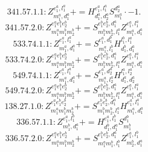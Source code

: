 \documentclass[letterpaper,10pt,fleqn,leqno,onecolumn]{article}
\begin{document}
\begin{equation} \;\;\;\;\;\;  341.57.1.1: Z^{e_{1}^{a},l_{1}^{a}}_{m_{1}^{a},d_{1}^{a}}+=H^{e_{1}^{a},l_{1}^{a}}_{d_{1}^{a},d_{2}^{a}}S^{d_{2}^{a}}_{m_{1}^{a}}\cdot -1. \end{equation}
\begin{equation} \;\;\;\;\;\;  341.57.2.0: Z^{e_{1}^{a}e_{1}^{b}e_{2}^{b}}_{m_{1}^{a}m_{1}^{b}m_{2}^{b}}+=S^{e_{1}^{b}e_{2}^{b},d_{1}^{a}}_{m_{1}^{b}m_{2}^{b},l_{1}^{a}}Z^{e_{1}^{a},l_{1}^{a}}_{m_{1}^{a},d_{1}^{a}} \end{equation}
\begin{equation} \;\;\;\;\;\;  533.74.1.1: Z^{e_{1}^{a},l_{1}^{a}}_{m_{1}^{a},d_{1}^{a}}+=S^{e_{1}^{a},d_{1}^{b}}_{m_{1}^{a},l_{1}^{b}}H^{l_{1}^{b},l_{1}^{a}}_{d_{1}^{b},d_{1}^{a}} \end{equation}
\begin{equation} \;\;\;\;\;\;  533.74.2.0: Z^{e_{1}^{a}e_{1}^{b}e_{2}^{b}}_{m_{1}^{a}m_{1}^{b}m_{2}^{b}}+=S^{e_{1}^{b}e_{2}^{b},d_{1}^{a}}_{m_{1}^{b}m_{2}^{b},l_{1}^{a}}Z^{e_{1}^{a},l_{1}^{a}}_{m_{1}^{a},d_{1}^{a}} \end{equation}
\begin{equation} \;\;\;\;\;\;  549.74.1.1: Z^{e_{1}^{a},l_{1}^{a}}_{m_{1}^{a},d_{1}^{a}}+=S^{e_{1}^{a},d_{2}^{a}}_{m_{1}^{a},l_{2}^{a}}H^{l_{1}^{a},l_{2}^{a}}_{d_{1}^{a},d_{2}^{a}} \end{equation}
\begin{equation} \;\;\;\;\;\;  549.74.2.0: Z^{e_{1}^{a}e_{1}^{b}e_{2}^{b}}_{m_{1}^{a}m_{1}^{b}m_{2}^{b}}+=S^{e_{1}^{b}e_{2}^{b},d_{1}^{a}}_{m_{1}^{b}m_{2}^{b},l_{1}^{a}}Z^{e_{1}^{a},l_{1}^{a}}_{m_{1}^{a},d_{1}^{a}} \end{equation}
\begin{equation} \;\;\;\;\;\;  138.27.1.0: Z^{e_{1}^{a}e_{1}^{b}e_{2}^{b}}_{m_{1}^{a}m_{1}^{b}m_{2}^{b}}+=S^{e_{1}^{b}e_{2}^{b},d_{1}^{a}}_{m_{1}^{b}m_{2}^{b},l_{1}^{a}}H^{e_{1}^{a},l_{1}^{a}}_{m_{1}^{a},d_{1}^{a}} \end{equation}
\begin{equation} \;\;\;\;\;\;  336.57.1.1: Z^{e_{1}^{a},l_{1}^{b}}_{m_{1}^{b},d_{1}^{a}}+=H^{e_{1}^{a},l_{1}^{b}}_{d_{1}^{b},d_{1}^{a}}S^{d_{1}^{b}}_{m_{1}^{b}} \end{equation}
\begin{equation} \;\;\;\;\;\;  336.57.2.0: Z^{e_{1}^{a}e_{1}^{b}e_{2}^{b}}_{m_{1}^{a}m_{1}^{b}m_{2}^{b}}+=S^{e_{1}^{b}e_{2}^{b},d_{1}^{a}}_{m_{1}^{a}m_{1}^{b},l_{1}^{b}}Z^{e_{1}^{a},l_{1}^{b}}_{m_{2}^{b},d_{1}^{a}} \end{equation}
\end{document}
